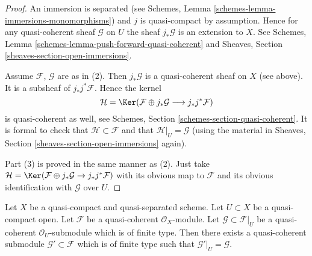 \begin{proof}
An immersion is separated
(see Schemes, Lemma \ref{schemes-lemma-immersions-monomorphisms})
and $j$ is quasi-compact by assumption.
Hence for any quasi-coherent sheaf $\mathcal{G}$ on $U$ the sheaf
$j_*\mathcal{G}$ is an extension to $X$. See
Schemes, Lemma \ref{schemes-lemma-push-forward-quasi-coherent} and
Sheaves, Section \ref{sheaves-section-open-immersions}.

\medskip\noindent
Assume $\mathcal{F}$, $\mathcal{G}$ are as in (2).
Then $j_*\mathcal{G}$ is a quasi-coherent sheaf on $X$ (see above).
It is a subsheaf of $j_*j^*\mathcal{F}$.
Hence the kernel
$$
\mathcal{H} =
\Ker(\mathcal{F} \oplus j_* \mathcal{G}
\longrightarrow j_*j^*\mathcal{F})
$$
is quasi-coherent as well, see
Schemes, Section \ref{schemes-section-quasi-coherent}.
It is formal to check that $\mathcal{H} \subset \mathcal{F}$ and that
$\mathcal{H}|_U = \mathcal{G}$ (using the material in
Sheaves, Section \ref{sheaves-section-open-immersions} again).

\medskip\noindent
Part (3) is proved in the same manner as (2). Just take
$\mathcal{H} = \Ker(\mathcal{F} \oplus j_* \mathcal{G}
\to j_*j^*\mathcal{F})$ with its obvious map to $\mathcal{F}$
and its obvious identification with $\mathcal{G}$ over $U$.
\end{proof}

\begin{lemma}
\label{lemma-extend}
Let $X$ be a quasi-compact and quasi-separated scheme.
Let $U \subset X$ be a quasi-compact open.
Let $\mathcal{F}$ be a quasi-coherent $\mathcal{O}_X$-module.
Let $\mathcal{G} \subset \mathcal{F}|_U$ be a quasi-coherent
$\mathcal{O}_U$-submodule which is of finite type. Then
there exists a quasi-coherent submodule $\mathcal{G}' \subset \mathcal{F}$
which is of finite type such that $\mathcal{G}'|_U = \mathcal{G}$.
\end{lemma}

